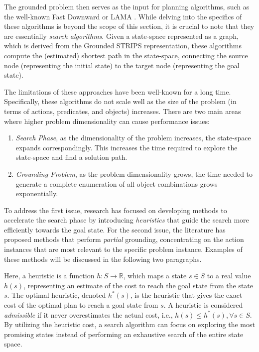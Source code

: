 The grounded problem then serves as the input for planning algorithms, such as the well-known Fast Downward \cite{helmert2006fast} or LAMA \cite{richter2010lama}. While delving into the specifics of these algorithms is beyond the scope of this section, it is crucial to note that they are essentially \textit{search algorithms}. Given a state-space represented as a graph, which is derived from the Grounded STRIPS representation, these algorithms compute the (estimated) shortest path in the state-space, connecting the source node (representing the initial state) to the target node (representing the goal state).

The limitations of these approaches have been well-known for a long time. Specifically, these algorithms do not scale well as the size of the problem (in terms of actions, predicates, and objects) increases. There are two main areas where higher problem dimensionality can cause performance issues:

\begin{enumerate}
    \item \textit{Search Phase}, as the dimensionality of the problem increases, the state-space expands correspondingly. This increases the time required to explore the state-space and find a solution path.
    \item \textit{Grounding Problem}, as the problem dimensionality grows, the time needed to generate a complete enumeration of all object combinations grows exponentially.
\end{enumerate}

To address the first issue, research has focused on developing methods to accelerate the search phase by introducing \textit{heuristics} that guide the search more efficiently towards the goal state. For the second issue, the literature has proposed methods that perform \textit{partial} grounding, concentrating on the action instances that are most relevant to the specific problem instance. Examples of these methods will be discussed in the following two paragraphs.

Here, a heuristic is a function $h: S \rightarrow \mathbb{R}$, which maps a state $s \in S$ to a real value $h(s)$, representing an estimate of the cost to reach the goal state from the state $s$. The optimal heuristic, denoted $h^{*}(s)$, is the heuristic that gives the exact cost of the optimal plan to reach a goal state from $s$. A heuristic is considered \textit{admissible} if it never overestimates the actual cost, i.e., $h(s) \leq h^{*}(s), \forall s \in S$. By utilizing the heuristic cost, a search algorithm can focus on exploring the most promising states instead of performing an exhaustive search of the entire state space.

